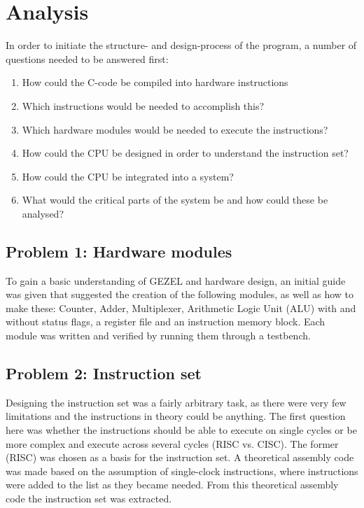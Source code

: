 \documentclass[12pt,a4paper]{article}
\begin{document}
\section{Analysis}
 	In order to initiate the structure- and design-process of the program, a number of questions needed to be answered first:\\
 	
 	\begin{enumerate}
	\item How could the C-code be compiled into hardware instructions
	\item Which instructions would be needed to accomplish this?
	\item Which hardware modules would be needed to execute the instructions?	
	\item How could the CPU be designed in order to understand the instruction set?
	\item How could the CPU be integrated into a system?
	\item What would the critical parts of the system be and how could these be analysed?
\end{enumerate}

\subsection{Problem 1: Hardware modules}
	To gain a basic understanding of GEZEL and hardware design, an initial guide was given that suggested the creation of the following modules, as well as how to make these: Counter, Adder, Multiplexer, Arithmetic Logic Unit (ALU) with and without status flags, a register file and an instruction memory block. Each module was written and verified by running them through a testbench.\\
\subsection{Problem 2: Instruction set}
	Designing the instruction set was a fairly arbitrary task, as there were very few limitations and the instructions in theory could be anything.
The first question here was whether the instructions should be able to execute on single cycles or be more complex and execute across several cycles (RISC vs. CISC). The former (RISC) was chosen as a basis for the instruction set. A theoretical assembly code was made based on the assumption of single-clock instructions, where instructions were added to the list as they became needed. From this theoretical assembly code the instruction set was extracted.\\
	
\end{document}
